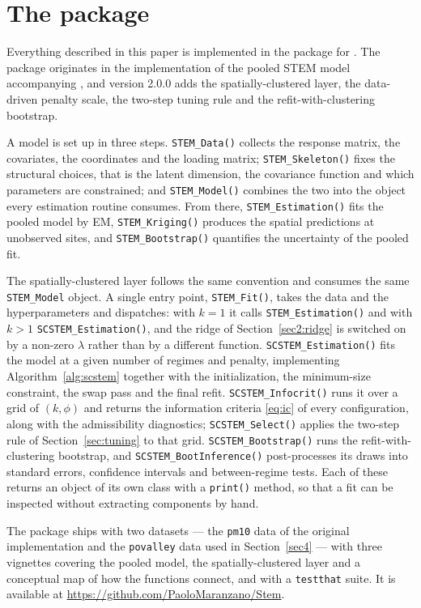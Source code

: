 \appendix
\section{The \Stem{} package}\label{app:package}

Everything described in this paper is implemented in the \Stem{} package for \Rlang{}. The package originates in the implementation of the pooled STEM model accompanying \citet{FassoCameletti2010}, and version 2.0.0 adds the spatially-clustered layer, the data-driven penalty scale, the two-step tuning rule and the refit-with-clustering bootstrap.

A model is set up in three steps. \texttt{STEM\_Data()} collects the response matrix, the covariates, the coordinates and the loading matrix; \texttt{STEM\_Skeleton()} fixes the structural choices, that is the latent dimension, the covariance function and which parameters are constrained; and \texttt{STEM\_Model()} combines the two into the object every estimation routine consumes. From there, \texttt{STEM\_Estimation()} fits the pooled model by EM, \texttt{STEM\_Kriging()} produces the spatial predictions at unobserved sites, and \texttt{STEM\_Bootstrap()} quantifies the uncertainty of the pooled fit.

The spatially-clustered layer follows the same convention and consumes the same \texttt{STEM\_Model} object. A single entry point, \texttt{STEM\_Fit()}, takes the data and the hyperparameters and dispatches: with $k = 1$ it calls \texttt{STEM\_Estimation()} and with $k > 1$ \texttt{SCSTEM\_Estimation()}, and the ridge of Section~\ref{sec2:ridge} is switched on by a non-zero $\lambda$ rather than by a different function. \texttt{SCSTEM\_Estimation()} fits the model at a given number of regimes and penalty, implementing Algorithm~\ref{alg:scstem} together with the initialization, the minimum-size constraint, the swap pass and the final refit. \texttt{SCSTEM\_Infocrit()} runs it over a grid of $(k, \phi)$ and returns the information criteria \eqref{eq:ic} of every configuration, along with the admissibility diagnostics; \texttt{SCSTEM\_Select()} applies the two-step rule of Section~\ref{sec:tuning} to that grid. \texttt{SCSTEM\_Bootstrap()} runs the refit-with-clustering bootstrap, and \texttt{SCSTEM\_BootInference()} post-processes its draws into standard errors, confidence intervals and between-regime tests. Each of these returns an object of its own class with a \texttt{print()} method, so that a fit can be inspected without extracting components by hand.

The package ships with two datasets --- the \texttt{pm10} data of the original implementation and the \texttt{povalley} data used in Section~\ref{sec4} --- with three vignettes covering the pooled model, the spatially-clustered layer and a conceptual map of how the functions connect, and with a \texttt{testthat} suite. It is available at \url{https://github.com/PaoloMaranzano/Stem}.





